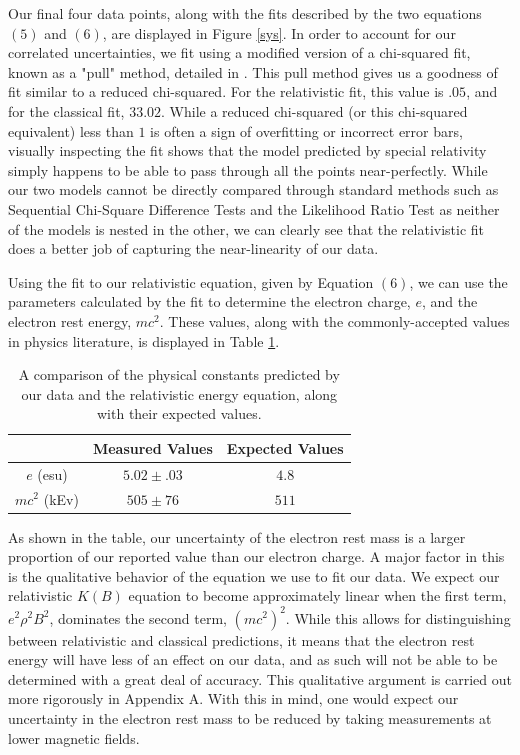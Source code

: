 Our final four data points, along with the fits described by the two equations $(5)$ and $(6)$, are displayed in Figure \ref{sys}. In order to account for our correlated uncertainties, we fit using a modified version of a chi-squared fit, known as a "pull" method, detailed in \cite{sys}. This pull method gives us a goodness of fit similar to a reduced chi-squared. For the relativistic fit, this value is $.05$, and for the classical fit, $33.02$. While a  reduced chi-squared (or this chi-squared equivalent) less than $1$ is often a sign of overfitting or incorrect error bars, visually inspecting the fit shows that the model predicted by special relativity simply happens to be able to pass through all the points near-perfectly. While our two models cannot be directly compared through standard methods such as Sequential Chi-Square Difference Tests \cite{diff} and the Likelihood Ratio Test \cite{ratio} as neither of the models is nested in the other, we can clearly see that the relativistic fit does a better job of capturing the near-linearity of our data.

Using the fit to our relativistic equation, given by Equation $(6)$, we can use the parameters calculated by the fit to determine the electron charge, $e$, and the electron rest energy, $mc^2$. These values, along with the commonly-accepted values in physics literature, is displayed in Table \ref{data}.

\begin{table}[h]
  \begin{ruledtabular}
    \begin{tabular}{ccc}
      &  Measured Values & Expected Values \\
      \hline
      $e$ (esu) & $5.02 \pm .03$ & $4.8$ \\
      $mc^2$ (kEv) & $505 \pm 76$ & $511$ \\
    \end{tabular}
  \end{ruledtabular}
  \caption{A comparison of the physical constants predicted by our data and the relativistic energy equation, along with their expected values.}
  \label{data}
\end{table}
As shown in the table, our uncertainty of the electron rest mass is a larger proportion of our reported value than our electron charge. A major factor in this is the qualitative behavior of the equation we use to fit our data. We expect our relativistic $K(B)$ equation to become approximately linear when the first term, $e^2 \rho^2 B^2$, dominates the second term, $(mc^2)^2$. While this allows for distinguishing between relativistic and classical predictions, it means that the electron rest energy will have less of an effect on our data, and as such will not be able to be determined with a great deal of accuracy. This qualitative argument is carried out more rigorously in Appendix A. With this in mind, one would expect our uncertainty in the electron rest mass to be reduced by taking measurements at lower magnetic fields.

